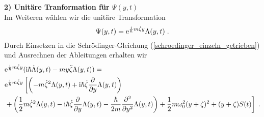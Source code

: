   \textbf{2) Unitäre Tranformation für $\Psi(y,t)$}\\
  Im Weiteren wählen wir die unitäre Transformation
  \begin{equation}
    \Psi(y,t) = \text e^{\frac{\text i}{\hbar}m\dot \zeta y}\Lambda(y,t) \; .
  \end{equation}
  Durch Einsetzen in die Schrödinger-Gleichung (\ref{schroedinger_einzeln_getrieben}) und Ausrechnen der Ableitungen erhalten wir
  \begin{align}
    \begin{split}
      &\text e^{\frac{\text i}{\hbar}m\dot \zeta y}(\text i \hbar \dot \Lambda(y,t) - my \ddot{\zeta}\Lambda(y,t)) =\\
       &\text e^{\frac{\text i}{\hbar}m\dot \zeta y} \left[\left(-m\dot \zeta^2 \Lambda(y,t) + \text i \hbar \dot \zeta \frac{\partial}{\partial y} \Lambda(y,t) \right) \right. \\
       &\left. + \left(\frac{1}{2}m\dot \zeta^2 \Lambda(y,t) - \text{i} \hbar \dot \zeta \frac{\partial}{\partial y} \Lambda(y,t) - \frac{\hbar}{2m}\frac{\partial^2}{\partial y^2} \Lambda(y,t)  \right)
      + \frac{1}{2}m\omega_0^2(y+\zeta)^2  + (y+\zeta)S(t)  \right] \; .
    \end{split}
  \end{align}
  \iffalse
  Durch Einsetzen in die Schrödinger-Gleichung und Ausrechnen der Ableitungen erhalten wir für die linke Seite von (\ref{schroedinger_einzeln_getrieben})
  \text e^{\frac{\text i}{\hbar}m\dot \zeta y}(\text i \hbar \dot \Lambda(y,t) - my \ddot{\zeta}\Lambda(y,t))
  \begin{equation}
  \end{equation}
  und für die rechte Seite
  \begin{align}
    \begin{split}
    \text e^{\frac{\text i}{\hbar}m\dot \zeta y} \left[\left(-m\dot \zeta^2 \Lambda(y,t) + \text i \hbar \dot \zeta \frac{\partial}{\partial y} \Lambda(y,t) \right) + \left(\frac{1}{2}m\dot \zeta^2 \Lambda(y,t) - \text{i} \hbar \dot \zeta \frac{\partial}{\partial y} \Lambda(y,t) - \frac{\hbar}{2m}\frac{\partial^2}{\partial y^2} \Lambda(y,t)  \right) \right. \\
    \left. + \left(\frac{1}{2}m\omega_0^2y^2\Lambda(y,t) + m\omega_0^2y\zeta\Lambda(y,t) + \frac{1}{2}m\omega_0^2 \zeta^2\Lambda(y,t)) \right) + \left(-yS(t)\Lambda(y,t) - \zeta S(t)\Lambda(y,t) \right) \right]
  \end{split}
  \end{align}
  \fi

